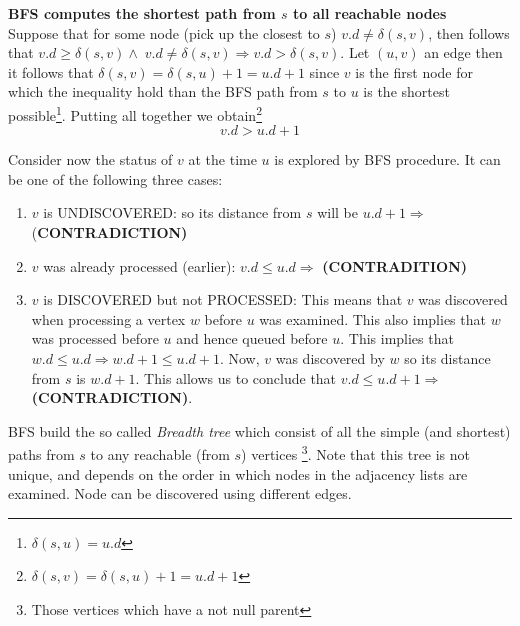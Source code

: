 \begin{theorem}{\textbf{BFS computes the shortest path from $s$ to all reachable nodes}\hfill \\}
Suppose that for some node (pick up the closest to $s$) $v.d \neq \delta(s,v)$,  then follows that $v.d \geq \delta(s,v)  \wedge \; v.d \neq \delta(s,v) \Rightarrow  v.d > \delta(s,v) $. Let $(u,v)$ an edge then it follows that $\delta(s,v) = \delta(s,u) + 1 = u.d +1$ since $v$ is the first node for which the inequality hold than the BFS path from $s$ to $u$ is the shortest possible\footnote{$\delta(s,u) = u.d$}.
Putting all together we obtain\footnote{$\delta(s,v) = \delta(s,u) + 1 = u.d +1$} 
\[
v.d > u.d + 1 
\]

Consider now the status of $v$ at the time $u$ is explored by BFS procedure. It can be one of the following three cases:
\begin{enumerate}
\item $v$ is UNDISCOVERED: so its distance from $s$ will be $u.d +1 \Rightarrow$ (\textbf{CONTRADICTION)}
\item $v$ was already processed (earlier): $v.d \leq u.d \Rightarrow$ \textbf{(CONTRADITION)}
\item $v$ is DISCOVERED but not PROCESSED: This means that $v$ was discovered when processing a vertex $w$ before $u$ was examined. This also implies that $w$ was processed before $u$ and hence queued before $u$. This implies that $ w.d \leq u.d \Rightarrow w.d+1 \leq u.d +1$. Now, $v$ was discovered by $w$ so its distance from $s$ is $w.d+1$. This allows us to conclude that $v.d \leq u.d+1 \Rightarrow$\textbf{(CONTRADICTION)}.
\end{enumerate}
\end{theorem}

BFS build the so called \textit{Breadth tree} which consist of all the simple (and shortest) paths from $s$ to any reachable (from $s$) vertices \footnote{Those vertices which have a not null parent}. Note that this tree is not unique, and depends on the order in which nodes in the adjacency lists are examined. Node can be discovered using different edges.



